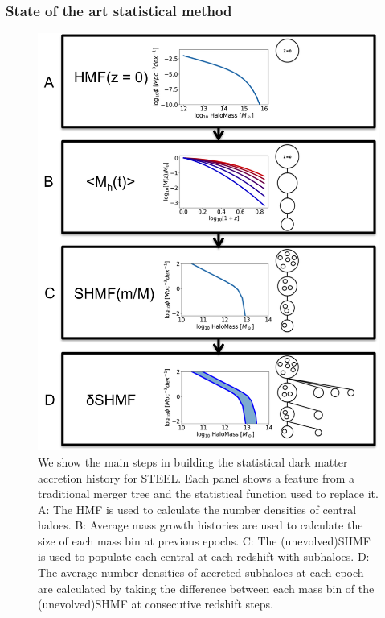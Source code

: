 \subsubsection{State of the art statistical method}
\begin{figure}[h!]
    \centering
    \includegraphics[width = \linewidth]{Figures/Chapter2/StatDM.png}
    \caption{We show the main steps in building the statistical dark matter accretion history for STEEL. Each panel shows a feature from a traditional merger tree and the statistical function used to replace it. A: The HMF is used to calculate the number densities of central haloes. B: Average mass growth histories are used to calculate the size of each mass bin at previous epochs. C: The (unevolved)SHMF is used to populate each central at each redshift with subhaloes. D: The average number densities of accreted subhaloes at each epoch are calculated by taking the difference between each mass bin of the (unevolved)SHMF at consecutive redshift steps.}
    \label{fig:StatDM}
\end{figure}

